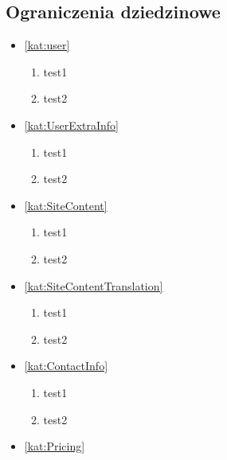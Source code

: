 \subsection{Ograniczenia dziedzinowe}

\begin{itemize}[label={\textbf{Ograniczenia dla}}, wide, labelwidth=!, labelindent=0pt]
    \setlength\itemsep{1em}
    \item\ref{kat:user}
    \begin{enumerate}[label={\textbf{OGR/\protect\threedigits{\arabic{enumi}}}}, wide, labelwidth=!]
        \item test1
        \item test2
    \end{enumerate}
    \item\ref{kat:UserExtraInfo}
    \begin{enumerate}[label={\textbf{OGR/\protect\threedigits{\arabic{enumi}}}}, wide, labelwidth=!, resume]
        \item test1
        \item test2
    \end{enumerate}
    \item\ref{kat:SiteContent}
    \begin{enumerate}[label={\textbf{OGR/\protect\threedigits{\arabic{enumi}}}}, wide, labelwidth=!, resume]
        \item test1
        \item test2
    \end{enumerate}
    \item\ref{kat:SiteContentTranslation}
    \begin{enumerate}[label={\textbf{OGR/\protect\threedigits{\arabic{enumi}}}}, wide, labelwidth=!, resume]
        \item test1
        \item test2
    \end{enumerate}
    \item\ref{kat:ContactInfo}
    \begin{enumerate}[label={\textbf{OGR/\protect\threedigits{\arabic{enumi}}}}, wide, labelwidth=!, resume]
        \item test1
        \item test2
    \end{enumerate}
    \item\ref{kat:Pricing}
    \begin{enumerate}[label={\textbf{OGR/\protect\threedigits{\arabic{enumi}}}}, wide, labelwidth=!, resume]

\end{enumerate}
\end{itemize}
